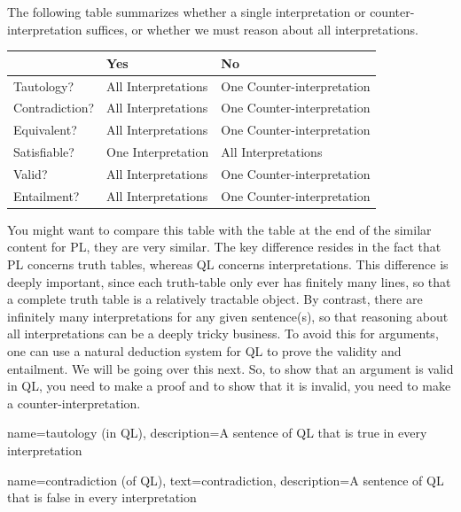 The following table summarizes whether a single interpretation or counter-interpretation suffices, or whether we must reason about all interpretations.\\
\begin{tabular}{l|ll}
&Yes&No\\
\hline
Tautology?&All Interpretations&One Counter-interpretation\\
Contradiction?&All Interpretations&One Counter-interpretation\\
Equivalent?&All Interpretations&One Counter-interpretation\\
Satisfiable?&One Interpretation&All Interpretations\\
Valid?&All Interpretations&One Counter-interpretation\\
Entailment?&All Interpretations&One Counter-interpretation\\
\end{tabular}

You might want to compare this table with the table at the end of the similar content for PL, they are very similar. The key difference resides in the fact that PL concerns truth tables, whereas QL concerns interpretations. This difference is deeply important, since each truth-table only ever has finitely many lines, so that a complete truth table is a relatively tractable object. By contrast, there are infinitely many interpretations for any given sentence(s), so that reasoning about all interpretations can be a deeply tricky business. To avoid this for arguments, one can use a natural deduction system for QL to prove the validity and entailment. We will be going over this next. So, to show that an argument is valid in QL, you need to make a proof and to show that it is invalid, you need to make a counter-interpretation.  



{
name=tautology (in QL),
description={A \gls{sentence of QL} that is true in every \gls{interpretation}}
}

{
  name=contradiction (of QL),
  text=contradiction,
description={A \gls{sentence of QL} that is false in every \gls{interpretation}}
}

